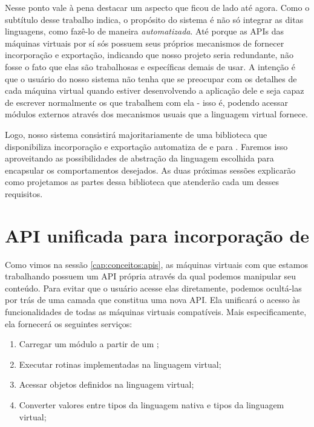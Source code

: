     Nesse ponto vale à pena destacar um aspecto que ficou de lado até agora.
    Como o subtítulo desse trabalho indica, o propósito do sistema é não só
    integrar as ditas linguagens, como fazê-lo de maneira \textit{automatizada}.
    Até porque as APIs das máquinas virtuais por sí sós possuem seus próprios
    mecanismos de fornecer incorporação e exportação, indicando que nosso
    projeto seria redundante, não fosse o fato que elas são trabalhosas e
    específicas demais de usar. A intenção é que o usuário do nosso sistema não
    tenha que se preocupar com os detalhes de cada máquina virtual quando
    estiver desenvolvendo a aplicação dele e seja capaz de escrever normalmente
    os  que trabalhem com ela - isso é, podendo acessar módulos
    externos através dos mecanismos usuais que a linguagem virtual fornece.

    Logo, nosso sistema consistirá majoritariamente de uma biblioteca \CXX{}
    que disponibiliza incorporação e exportação automatiza de e para .
    Faremos isso aproveitando as possibilidades de abstração da linguagem
    escolhida para encapsular os comportamentos desejados. As duas próximas
    sessões explicarão como projetamos as partes dessa biblioteca que atenderão
    cada um desses requisitos.

  \section{API unificada para incorporação de }
  \label{sec:estrutura:opa}

    Como vimos na sessão \ref{cap:conceitos:apis}, as máquinas virtuais com que
    estamos trabalhando possuem um API própria através da qual podemos manipular
    seu conteúdo. Para evitar que o usuário acesse elas diretamente, podemos
    ocultá-las por trás de uma camada que constitua uma nova API. Ela unificará
    o acesso às funcionalidades de todas as máquinas virtuais compatíveis. Mais
    especificamente, ela fornecerá os seguintes serviços:


    \begin{enumerate}
      \item Carregar um módulo a partir de um \script{};
      \item Executar rotinas implementadas na linguagem virtual;
      \item Acessar objetos definidos na linguagem virtual;
      \item Converter valores entre tipos da linguagem nativa e tipos da
            linguagem virtual;
    \end{enumerate}

